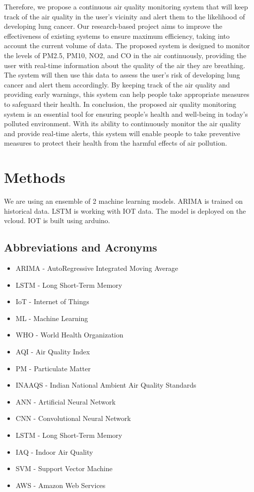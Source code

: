 \documentclass[conference]{IEEEtran}
\begin{document}
Therefore, we propose a continuous air quality monitoring system that will keep track of the air
quality in the user's vicinity and alert them to the likelihood of developing lung cancer. Our
research-based project aims to improve the effectiveness of existing systems to ensure maximum
efficiency, taking into account the current volume of data.
The proposed system is designed to monitor the levels of PM2.5, PM10, NO2, and CO in the air
continuously, providing the user with real-time information about the quality of the air they are breathing. The system will then use this data to assess the user's risk of developing lung cancer and
alert them accordingly. By keeping track of the air quality and providing early warnings, this system
can help people take appropriate measures to safeguard their health.
In conclusion, the proposed air quality monitoring system is an essential tool for ensuring people's
health and well-being in today's polluted environment. With its ability to continuously monitor the air
quality and provide real-time alerts, this system will enable people to take preventive measures to
protect their health from the harmful effects of air pollution.

\section{Methods}
We are using an ensemble of 2 machine learning models. ARIMA is trained on historical data. LSTM is working with IOT data. The model is deployed on the vcloud. IOT is built using arduino.

\subsection{Abbreviations and Acronyms}\label{AA}
\begin{itemize}
    \item ARIMA - AutoRegressive Integrated Moving Average
    \item LSTM - Long Short-Term Memory
    \item IoT - Internet of Things
    \item ML - Machine Learning
    \item WHO - World Health Organization
    \item AQI - Air Quality Index
    \item PM - Particulate Matter
    \item INAAQS - Indian National Ambient Air Quality Standards
    \item ANN - Artificial Neural Network
    \item CNN - Convolutional Neural Network
    \item LSTM - Long Short-Term Memory
    \item IAQ - Indoor Air Quality
    \item SVM - Support Vector Machine
    \item AWS - Amazon Web Services
\end{itemize}
\end{document}

